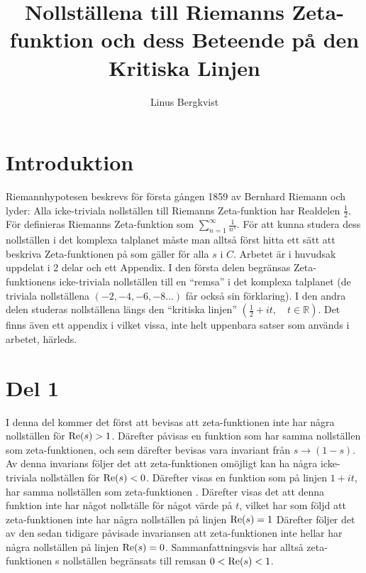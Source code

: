 \documentclass[a4paper,twoside]{article}%
\begin{document}
\title{Nollställena till Riemanns Zeta-funktion och dess Beteende på den Kritiska Linjen}
\author{Linus Bergkvist}
\date{}
\maketitle

\pagebreak
\section*{Introduktion}
Riemannhypotesen beskrevs för första gången 1859 av Bernhard Riemann och lyder:
Alla icke-triviala nollställen till Riemanns Zeta-funktion har Realdelen $\frac 1 2$.
För  definieras Riemanns Zeta-funktion som $\sum\limits_{n = 1}^\infty \frac 1 {n^s}$. 
För att kunna studera dess nollställen i det komplexa talplanet måste man alltså först hitta
ett sätt att beskriva Zeta-funktionen på som gäller för alla $s$ i $C$. 
Arbetet är i huvudsak uppdelat i 2 delar och ett Appendix. I den första delen begränsas 
Zeta-funktionens icke-triviala nollställen till en ``remsa'' i det komplexa talplanet 
(de triviala nollställena $(-2, -4, -6, -8\ldots)$ får också sin förklaring). 
I den andra delen studeras nollställena längs den ``kritiska linjen'' $(\frac 1 2 + it,\quad t \in \mathbb{R})$.
Det finns även ett appendix i vilket vissa, inte helt uppenbara satser som används i arbetet, härleds.

\newcommand{\mres}{
	\mRe{s}
}

\newcommand{\zfn}{
	zeta-funktionen
}

\section*{Del 1}
I denna del kommer det först att bevisas att zeta-funktionen inte har några nollställen för $\mres > 1$.
Därefter påvisas en funktion som har samma nollställen som zeta-funktionen, och sem därefter bevisas
vara invariant från $s \to (1 - s)$. Av denna invarians följer det att zeta-funktionen omöjligt kan 
ha några icke-triviala nollställen för $\mres < 0$. Därefter visas en funktion som på linjen $1 + it$, har
samma nollställen som \zfn. Därefter visas det att denna funktion inte har något nollställe för något värde
på $t$, vilket har som följd att \zfn inte har några nollställen på linjen $\mres = 1$ Därefter följer det 
av den sedan tidigare påvisade invariansen att \zfn inte hellar har några nollställen på linjen $\mres = 0$.
Sammanfattningsvis har alltså \zfn{}s nollställen begränsats till remsan $0 < \mres < 1$.\\
\\
\end{document}
